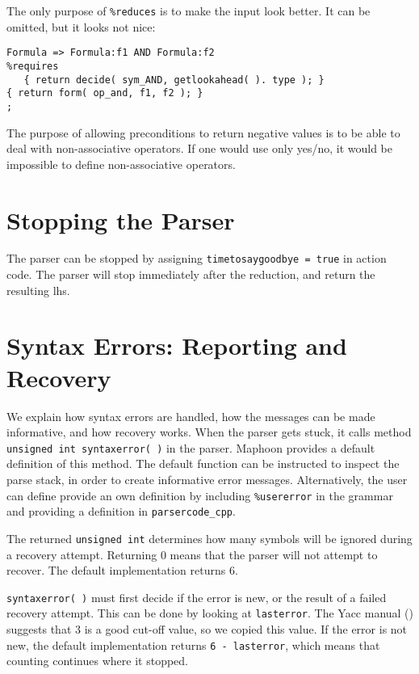 \documentclass{article}
\begin{document}
The only purpose of \verb+%reduces+ is to make the input look better.
It can be omitted, but it looks not nice: 
\begin{verbatim}
Formula => Formula:f1 AND Formula:f2
%requires
   { return decide( sym_AND, getlookahead( ). type ); }
{ return form( op_and, f1, f2 ); }
; \end{verbatim}

\noindent
The purpose of allowing preconditions to return
negative values is to be able to deal with non-associative operators. 
If one would use only yes/no, it would be impossible to 
define non-associative operators.

\section{Stopping the Parser}
\label{Sect_timetosaygoodbye}

The parser can be stopped by assigning
\verb+timetosaygoodbye = true+ in action code. 
The parser will stop immediately after the reduction,
and return the resulting lhs.

\section{Syntax Errors: Reporting and Recovery}
 
\noindent
We explain how syntax errors are handled, how the messages can be 
made informative, and how recovery works. 
When the parser gets stuck, it calls method 
\verb+unsigned int syntaxerror( )+ in the parser. 
Maphoon provides a default definition of this method. 
The default function can be instructed
to inspect the parse stack, in order to create informative error messages. 
Alternatively, the user can define provide an own definition by 
including \verb+%usererror+ in the grammar and providing a definition in
\verb+parsercode_cpp+. 

The returned \verb+unsigned int+ determines how many 
symbols will be ignored during a recovery attempt. 
Returning $ 0 $ means that the parser will not attempt
to recover. The default implementation returns $ 6. $ 

\verb+syntaxerror( )+ must first decide if the error
is new, or the result of a failed recovery attempt.
This can be done by looking at \verb+lasterror+.
The Yacc manual (\cite{Yacc_system}) suggests that $ 3 $ is a good 
cut-off value, so we copied this value. 
If the error is not new, the default implementation
returns \verb+6 - lasterror+, which
means that counting continues where it stopped. 
\end{document}
